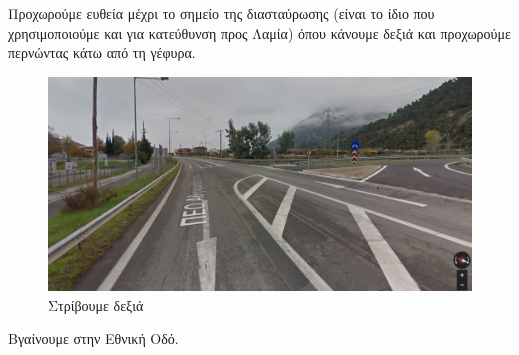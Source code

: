 Προχωρούμε ευθεία μέχρι το σημείο της διασταύρωσης (είναι το ίδιο που χρησιμοποιούμε και για κατεύθυνση προς Λαμία) όπου κάνουμε δεξιά και προχωρούμε περνώντας κάτω από τη γέφυρα. 
\begin{figure}[H]
\includegraphics[width=\textwidth]{images/lamia-athina/lamia/lamia_007.jpg}
\caption{Στρίβουμε δεξιά} 
\end{figure}


Βγαίνουμε στην Εθνική Οδό.


